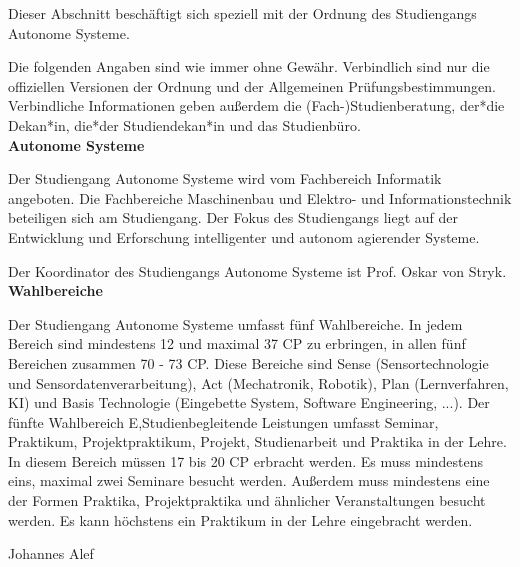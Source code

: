 {Dieser Abschnitt beschäftigt sich speziell mit der Ordnung des Studiengangs Autonome Systeme.
}{
Die folgenden Angaben sind wie immer ohne Gewähr. Verbindlich sind nur die offiziellen Versionen der Ordnung und der Allgemeinen Prüfungsbestimmungen. Verbindliche Informationen geben außerdem die (Fach-)Studienberatung, der*die Dekan*in, die*der Studiendekan*in und das Studienbüro.\\

\noindent\textbf{Autonome Systeme}

Der Studiengang Autonome Systeme wird vom Fachbereich Informatik angeboten. Die Fachbereiche Maschinenbau und Elektro- und Informationstechnik beteiligen sich am Studiengang. Der Fokus des Studiengangs liegt auf der Entwicklung und Erforschung intelligenter und autonom agierender Systeme.

Der Koordinator des Studiengangs Autonome Systeme ist Prof. Oskar von Stryk.\\

\noindent\textbf{Wahlbereiche}

Der Studiengang Autonome Systeme umfasst fünf Wahlbereiche. In jedem Bereich sind mindestens 12 und maximal 37 CP zu erbringen, in allen fünf Bereichen zusammen 70 - 73 CP. Diese Bereiche sind Sense (Sensortechnologie und Sensordatenverarbeitung), Act (Mechatronik, Robotik), Plan (Lernverfahren, KI) und Basis Technologie (Eingebette System, Software Engineering, ...). Der fünfte Wahlbereich E,Studienbegleitende Leistungen umfasst Seminar, Praktikum, Projektpraktikum, Projekt, Studienarbeit und Praktika in der Lehre. In diesem Bereich müssen 17 bis 20 CP erbracht werden. Es muss mindestens eins, maximal zwei Seminare besucht werden. Außerdem muss mindestens eine der Formen Praktika, Projektpraktika und ähnlicher Veranstaltungen besucht werden. Es kann höchstens ein Praktikum in der Lehre eingebracht werden.\\

}
{Johannes Alef}
